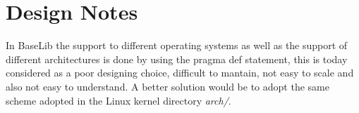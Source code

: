 \section{Design Notes}
In BaseLib the support to different operating systems as well as the support of different architectures is done by using the pragma def statement, this is today considered as a poor designing choice, difficult to mantain, not easy to scale and also not easy to understand. A better solution would be to adopt the same scheme adopted in the Linux kernel directory \textit{arch/}. \\


